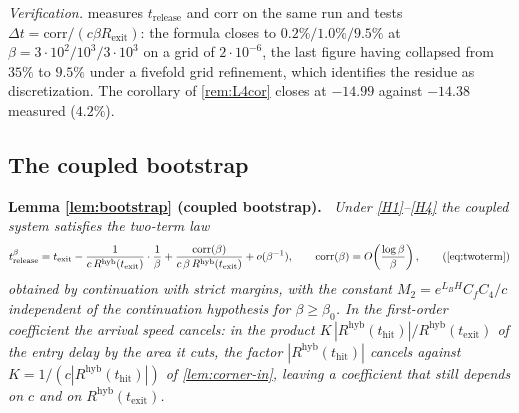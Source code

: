 \documentclass[11pt]{article}
\theoremstyle{definition}
\theoremstyle{remark}
\newcommand{\thit}{t_{\mathrm{hit}}}
\newcommand{\texit}{t_{\mathrm{exit}}}
\newcommand{\trel}{t_{\mathrm{release}}}
\newcommand{\hyb}{\mathrm{hyb}}
\newenvironment{lemmarep}[2]{%
  \par\medskip\noindent\textbf{Lemma \ref{#1} (#2).}\itshape\ \ignorespaces}%
  {\par\medskip}
\begin{document}
\noindent\emph{Verification.}  measures $\trel$
and $\mathrm{corr}$ on the same run and tests
$\Delta t=\mathrm{corr}/(c\beta R_{\mathrm{exit}})$: the formula closes to
$0.2\%/1.0\%/9.5\%$ at $\beta=3\cdot10^2/10^3/3\cdot10^3$ on a grid of
$2\cdot10^{-6}$, the last figure having collapsed from $35\%$ to $9.5\%$ under a
fivefold grid refinement, which identifies the residue as discretization. The
corollary of \cref{rem:L4cor} closes at $-14.99$ against $-14.38$ measured
($4.2\%$).

\subsection{The coupled bootstrap}\label{app:L5}

\begin{lemmarep}{lem:bootstrap}{coupled bootstrap}
Under \eqref{H1}--\eqref{H4} the coupled system satisfies the two-term law
\begin{equation*}
t^\beta_{\mathrm{release}}
=\texit-\frac{1}{c\,R^{\hyb}(\texit)}\cdot\frac{1}{\beta}
+\frac{\mathrm{corr}(\beta)}{c\,\beta\,R^{\hyb}(\texit)}+o(\beta^{-1}),
\qquad \mathrm{corr}(\beta)=O\!\left(\frac{\log\beta}{\beta}\right),
\tag{\ref{eq:twoterm}}
\end{equation*}
obtained by continuation with strict margins, with the constant
$M_2=e^{L_BH}C_fC_4/c$ independent of the continuation hypothesis for
$\beta\ge\beta_0$. In the first-order coefficient the arrival speed cancels: in
the product $K\,|R^{\hyb}(\thit)|/R^{\hyb}(\texit)$ of the entry delay by the
area it cuts, the factor $|R^{\hyb}(\thit)|$ cancels against
$K=1/(c|R^{\hyb}(\thit)|)$ of \cref{lem:corner-in}, leaving a coefficient that
still depends on $c$ and on $R^{\hyb}(\texit)$.
\end{lemmarep}
\end{document}
